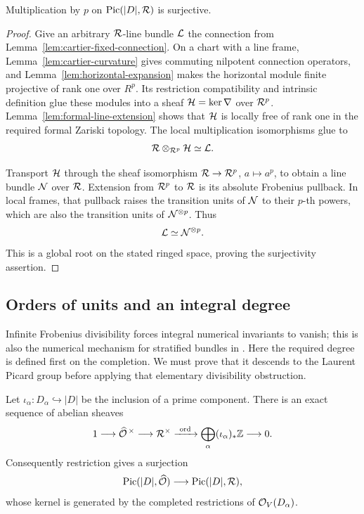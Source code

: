 \begin{proposition}
\label{prop:picard-divisibility}
Multiplication by \(p\) on \(\operatorname{Pic}(|D|,\mathcal R)\) is surjective.
\end{proposition}

\begin{proof}
Give an arbitrary \(\mathcal R\)-line bundle \(\mathcal L\) the connection
from Lemma~\ref{lem:cartier-fixed-connection}.  On a chart with
a line frame, Lemma~\ref{lem:cartier-curvature} gives commuting
nilpotent connection operators, and
Lemma~\ref{lem:horizontal-expansion} makes the horizontal
module finite projective of rank one over \(R^p\).
Its restriction compatibility and intrinsic definition glue
these modules into a sheaf \(\mathcal H=\ker\nabla\) over \(\mathcal R^p\).
Lemma~\ref{lem:formal-line-extension} shows that \(\mathcal H\) is
locally free of rank one in the required formal Zariski topology.
The local multiplication isomorphisms glue to
\[
 \mathcal R\otimes_{\mathcal R^p}\mathcal H\simeq\mathcal L.
\]

Transport \(\mathcal H\) through the sheaf isomorphism
\(\mathcal R\to\mathcal R^p\), \(a\mapsto a^p\), to obtain a line
bundle \(\mathcal N\) over \(\mathcal R\).  Extension from \(\mathcal R^p\)
to \(\mathcal R\) is its absolute Frobenius pullback.  In local
frames, that pullback raises the transition units of \(\mathcal N\)
to their \(p\)-th powers, which are also the transition units
of \(\mathcal N^{\otimes p}\).  Thus
\[
                  \mathcal L\simeq\mathcal N^{\otimes p}.
\]
This is a global root on the stated ringed space, proving the
surjectivity assertion.
\end{proof}

\subsection{Orders of units and an integral degree}

Infinite Frobenius divisibility forces integral numerical invariants
to vanish; this is also the numerical mechanism for stratified bundles
in \cite[Lemma~2.1 and Corollary~2.2]{esnaultmehta2010}.
Here the required degree is defined first on the completion.  We must
prove that it descends to the Laurent Picard group before applying that
elementary divisibility obstruction.

\begin{lemma}
\label{lem:laurent-unit-orders}
Let \(\iota_\alpha:D_\alpha\hookrightarrow|D|\) be the
inclusion of a prime component.  There is an exact sequence of
abelian sheaves
\begin{equation}
 1\longrightarrow\widehat{\mathcal O}^{\,\times}
 \longrightarrow\mathcal R^\times
 \xrightarrow{\ \operatorname{ord}\ }
 \bigoplus_\alpha(\iota_\alpha)_*\mathbb Z
 \longrightarrow0.
 \label{eq:laurent-unit-orders}
\end{equation}
Consequently restriction gives a surjection
\[
 \operatorname{Pic}(|D|,\widehat{\mathcal O})\longrightarrow\operatorname{Pic}(|D|,\mathcal R),
\]
whose kernel is generated by the completed restrictions of
\(\mathcal O_V(D_\alpha)\).
\end{lemma}

